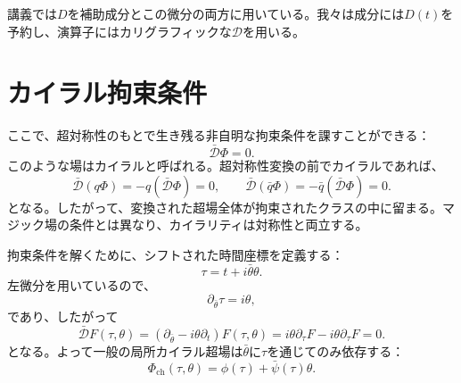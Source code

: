 講義では\(D\)を補助成分とこの微分の両方に用いている。我々は成分には\(D(t)\)を予約し、演算子にはカリグラフィックな\(\mathcal D\)を用いる。

\section{カイラル拘束条件}

ここで、超対称性のもとで生き残る非自明な拘束条件を課すことができる：
\begin{equation}
\bar{\mathcal D}\Phi=0.
\label{eq:l7-chiral-constraint}
\end{equation}
このような場はカイラルと呼ばれる。超対称性変換の前でカイラルであれば、
\begin{equation}
\bar{\mathcal D}(q\Phi)
=-q(\bar{\mathcal D}\Phi)=0,
\qquad
\bar{\mathcal D}(\bar q\Phi)
=-\bar q(\bar{\mathcal D}\Phi)=0.
\end{equation}
となる。したがって、変換された超場全体が拘束されたクラスの中に留まる。マジック場の条件とは異なり、カイラリティは対称性と両立する。

拘束条件を解くために、シフトされた時間座標を定義する：
\begin{equation}
\tau=t+i\bar\theta\theta.
\label{eq:l7-chiral-time}
\end{equation}
左微分を用いているので、
\begin{equation}
\partial_{\bar\theta}\tau=i\theta,
\end{equation}
であり、したがって
\begin{equation}
\bar{\mathcal D}F(\tau,\theta)
=\left(\partial_{\bar\theta}-i\theta\partial_t\right)F(\tau,\theta)
=i\theta\partial_\tau F-i\theta\partial_\tau F=0.
\end{equation}
となる。よって一般の局所カイラル超場は\(\bar\theta\)に\(\tau\)を通じてのみ依存する：
\begin{equation}
\Phi_{\mathrm{ch}}(\tau,\theta)
=\phi(\tau)+\bar\psi(\tau)\theta.
\label{eq:l7-chiral-field-tau}
\end{equation}

\begin{classroomqa}
\end{classroomqa}

